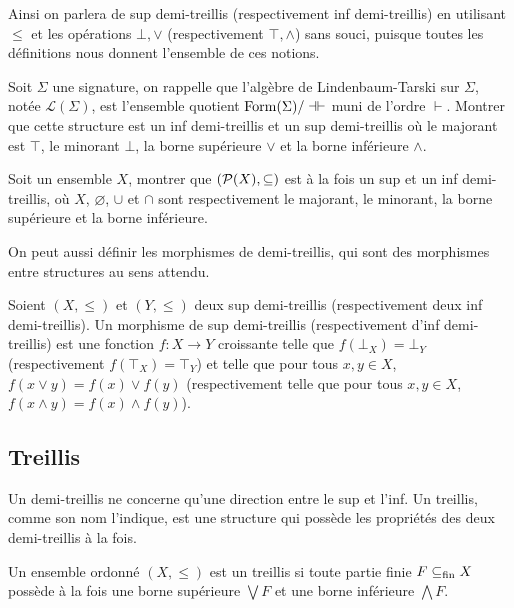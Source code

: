 Ainsi on parlera de sup demi-treillis (respectivement inf demi-treillis) en
utilisant $\leq$ et les opérations $\bot,\lor$ (respectivement $\top,\land$)
sans souci, puisque toutes les définitions nous donnent l'ensemble de ces
notions.

\begin{exercise}
  Soit $\Sigma$ une signature, on rappelle que l'algèbre de Lindenbaum-Tarski
  sur $\Sigma$, notée $\mathcal L(\Sigma)$, est l'ensemble quotient
  $\operatorname{Form}(\Sigma)/\dashv\vdash$ muni de l'ordre $\vdash$. Montrer que
  cette structure est un inf demi-treillis et un sup demi-treillis où le
  majorant est $\top$, le minorant $\bot$, la borne supérieure $\lor$ et la
  borne inférieure $\land$.
\end{exercise}

\begin{exercise}
  Soit un ensemble $X$, montrer que $(\mathcal{P}(X),\subseteq)$ est à la fois un
  sup et un inf demi-treillis, où $X$, $\varnothing$, $\cup$ et $\cap$ sont
  respectivement le majorant, le minorant, la borne supérieure et la borne
  inférieure.
\end{exercise}

On peut aussi définir les morphismes de demi-treillis, qui sont des morphismes
entre structures au sens attendu.

\begin{definition}
  Soient $(X,\leq)$ et $(Y,\leq)$ deux sup demi-treillis (respectivement deux
  inf demi-treillis). Un morphisme de sup demi-treillis (respectivement d'inf
  demi-treillis) est une fonction $f : X \to Y$ croissante telle que
  $f(\bot_X) = \bot_Y$ (respectivement $f(\top_X) = \top_Y$) et telle que pour
  tous $x,y\in X$, $f(x\lor y) = f(x)\lor f(y)$ (respectivement telle que pour
  tous $x,y\in X$, $f(x\land y) = f(x)\land f(y)$).
\end{definition}

\subsection{Treillis}

Un demi-treillis ne concerne qu'une direction entre le sup et l'inf. Un
treillis, comme son nom l'indique, est une structure qui possède les propriétés
des deux demi-treillis à la fois.

\begin{definition}[Treillis]
  Un ensemble ordonné $(X,\leq)$ est un treillis si toute partie finie
  $F\subseteq_{\mathrm{fin}} X$ possède à la fois une borne supérieure $\bigvee F$ et une borne
  inférieure $\bigwedge F$.
\end{definition}

